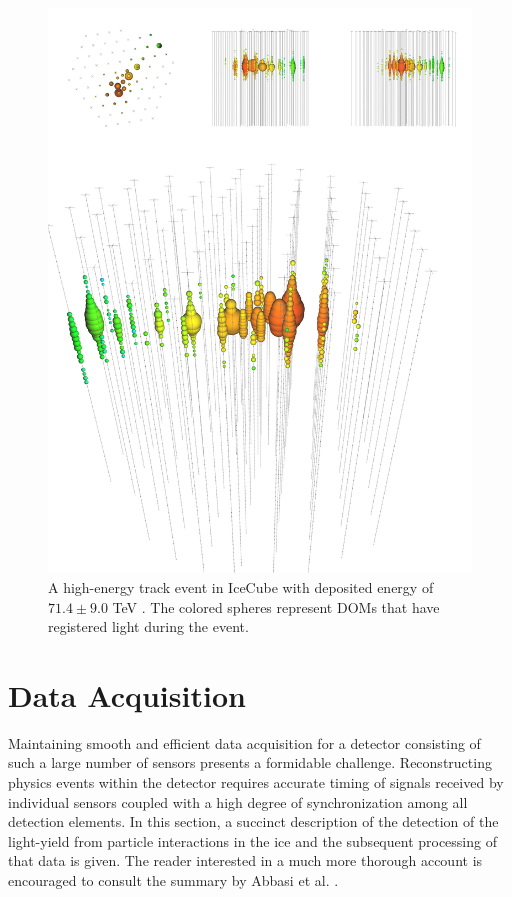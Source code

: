 \documentclass{gatech-thesis}
\begin{document}
\begin{figure}[ht]
  \begin{center}
    \includegraphics[width=1.0\textwidth,keepaspectratio]{hese_track_event.png}
  \end{center}
  \caption{A high-energy track event in IceCube with deposited energy of $71.4 \pm 9.0$ TeV \cite{2013Sci...342E...1I}. The colored spheres represent DOMs that have registered light during the event.}
  \label{fig:track}
\end{figure}


\chapter{Data Acquisition}
Maintaining smooth and efficient data acquisition for a detector consisting of such a large number of sensors presents a formidable challenge. Reconstructing physics events within the detector requires accurate timing of signals received by individual sensors coupled with a high degree of synchronization among all detection elements. In this section, a succinct description of the detection of the light-yield from particle interactions in the ice and the subsequent processing of that data is given. The reader interested in a much more thorough account is encouraged to consult the summary by Abbasi et al. \cite{2009NIMPA.601..294A}. 
\end{document}
